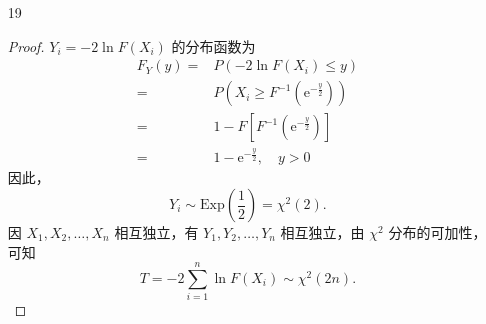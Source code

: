 \documentclass[normal,founder,mtpro2,cn]{elegantnote}
\begin{document}
\begin{enumerate}
\begin{proof}
            当 $r=2$ 时，由于 $k>0$，只要 $m>4$，就有
            \begin{equation*}
                E\left(F^{2}\right)=\frac{m^{2}\Gamma\left(\frac{k}{2}+2\right)\Gamma\left(\frac{m}{2}-2\right)}{k^{2}\Gamma\left(\frac{k}{2}\right)\Gamma\left(\frac{m}{2}\right)}=\frac{m^{2}(k+2)}{k(m-2)(m-4)}
            \end{equation*}

            因此，
            \begin{equation*}
                \operatorname{Var}(F)=E\left(F^{2}\right)-[E(F)]^{2}=\frac{m^{2}(k+2)}{k(m-2)(m-4)}-\left(\frac{m}{m-2}\right)^{2}=\frac{2m^{2}(m+k-2)}{k(m-2)^{2}(m-4)}
            \end{equation*}
        \end{proof}
    \item[19]
        \begin{proof}
            $Y_{i}=-2\ln F\left(X_{i}\right)$ 的分布函数为
            \begin{equation*}
                \begin{aligned}
                    F_{Y}(y)= & P\left(-2\ln F\left(X_{i}\right)\leq y\right)                        \\
                    =         & P\left(X_{i}\geq F^{-1}\left(\mathrm{e}^{-\frac{y}{2}}\right)\right) \\
                    =         & 1-F\left[F^{-1}\left(\mathrm{e}^{-\frac{y}{2}}\right)\right]         \\
                    =         & 1-\mathrm{e}^{-\frac{y}{2}},\quad y>0
                \end{aligned}
            \end{equation*}
            因此，
            \begin{equation*}
                Y_{i}\sim\text{Exp}\left(\frac{1}{2}\right)=\chi^{2}(2).
            \end{equation*}
            因 $X_{1},X_{2},\ldots,X_{n}$ 相互独立，有 $Y_{1},Y_{2},\ldots,Y_{n}$ 相互独立，由 $\chi^{2}$ 分布的可加性，可知
            \begin{equation*}
                T=-2\sum_{i=1}^{n}\ln F\left(X_{i}\right)\sim\chi^{2}(2n).
            \end{equation*}
        \end{proof}
\end{enumerate}
\end{document}
